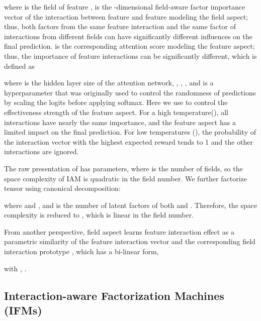 \documentclass[letterpaper]{article} \usepackage{aaai19}  \usepackage{times}  \usepackage{helvet}  \usepackage{courier}  \usepackage{url}  \usepackage{graphicx}  \frenchspacing  \setlength{\pdfpagewidth}{8.5in}  \setlength{\pdfpageheight}{11in}  \usepackage{mathtools}
\begin{document}
where  is the field of feature ,  is the -dimensional field-aware factor importance vector of the interaction between feature  and feature  modeling the field aspect; thus, both factors from the same feature interaction and the same factor of interactions from different fields can have significantly different influences on the final prediction.  is the corresponding attention score modeling the feature aspect; thus, the importance of feature interactions can be significantly different, which is defined as

where  is the hidden layer size of the attention network, , , , and  is a hyperparameter that was originally used to control the randomness of predictions by scaling the logits before applying softmax\cite{hinton2015distilling}. Here we use  to control the effectiveness strength of the feature aspect. For a high temperature(), all interactions have nearly the same importance, and the feature aspect has a limited impact on the final prediction. For low temperatures (), the probability of the interaction vector with the highest expected reward tends to 1 and the other interactions are ignored.

The raw presentation of  has  parameters, where  is the number of fields, so the space complexity of IAM is quadratic in the field number. We further factorize tensor  using canonical decomposition\cite{kolda2009tensor}:


where  and , and  is the number of latent factors of both  and . Therefore, the space complexity is reduced to , which is linear in the field number.


From another perspective, field aspect learns feature interaction effect as a parametric similarity of the feature interaction vector  and the corresponding field interaction prototype , which has a bi-linear form\cite{chechik2010large},

with , .

\subsection{Interaction-aware Factorization Machines (IFMs)}
\end{document}
